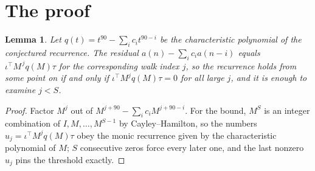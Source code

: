 \documentclass[11pt,a4paper]{article}
\theoremstyle{plain}
\newtheorem{lemma}[theorem]{Lemma}
\theoremstyle{definition}
\begin{document}
\section{The proof}

\begin{lemma}\label{lem:crit}
Let $q(t)=t^{90}-\sum_i c_it^{90-i}$ be the characteristic polynomial of the
conjectured recurrence. The residual $a(n)-\sum_ic_ia(n-i)$ equals
$\iota^{\!\top}M^{\,j}q(M)\tau$ for the corresponding walk index $j$, so the recurrence
holds from some point on if and only if $\iota^{\!\top}M^{j}q(M)\tau=0$ for all large $j$,
and it is enough to examine $j<S$.
\end{lemma}

\begin{proof}
Factor $M^{j}$ out of $M^{j+90}-\sum_ic_iM^{j+90-i}$. For the bound, $M^{S}$
is an integer combination of $I,M,\dots,M^{S-1}$ by Cayley--Hamilton, so the numbers
$u_j=\iota^{\!\top}M^{j}q(M)\tau$ obey the monic recurrence given by the characteristic
polynomial of $M$; $S$ consecutive zeros force every later one, and the last nonzero $u_j$
pins the threshold exactly.
\end{proof}
\end{document}
